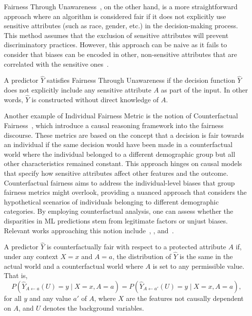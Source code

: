 Fairness Through Unawareness~\cite{Corbett-Davies2023}, on the other hand, is a more straightforward approach where an algorithm is considered fair if it does not explicitly use sensitive attributes (such as race, gender, etc.) in the decision-making process. This method assumes that the exclusion of sensitive attributes will prevent discriminatory practices. However, this approach can be naive as it fails to consider that biases can be encoded in other, non-sensitive attributes that are correlated with the sensitive ones~\cite{Mehrabi2019,caton2023,Hort2023}.

\begin{definition}\label{def:ftu}
A predictor $\hat{Y}$ satisfies Fairness Through Unawareness if the decision function $\hat{Y}$ does not explicitly include any sensitive attribute $A$ as part of the input. In other words, $\hat{Y}$ is constructed without direct knowledge of $A$.
\end{definition}

Another example of Individual Fairness Metric is the notion of Counterfactual Fairness~\citep{Kusner2018}, which introduce a causal reasoning framework into the fairness discourse. These metrics are based on the concept that a decision is fair towards an individual if the same decision would have been made in a counterfactual world where the individual belonged to a different demographic group but all other characteristics remained constant. This approach hinges on causal models that specify how sensitive attributes affect other features and the outcome. Counterfactual fairness aims to address the individual-level biases that group fairness metrics might overlook, providing a nuanced approach that considers the hypothetical scenarios of individuals belonging to different demographic categories. By employing counterfactual analysis, one can assess whether the disparities in ML predictions stem from legitimate factors or unjust biases. Relevant works approaching this notion include~\citet{Wu2022}, \citet{Yuchen2023}, and~\citet{GrariLD23}.

\begin{definition}\label{def:counterfactual_fairness}
A predictor $\hat{Y}$ is counterfactually fair with respect to a protected attribute $A$ if, under any context $X = x$ and $A = a$, the distribution of $\hat{Y}$ is the same in the actual world and a counterfactual world where $A$ is set to any permissible value. That is,
$$
P(\hat{Y}_{A \leftarrow a}(U) = y \mid X = x, A = a) = P(\hat{Y}_{A \leftarrow a'}(U) = y \mid X = x, A = a),
$$
for all $y$ and any value $a'$ of $A$, where $X$ are the features not causally dependent on $A$, and $U$ denotes the background variables.
\end{definition}

